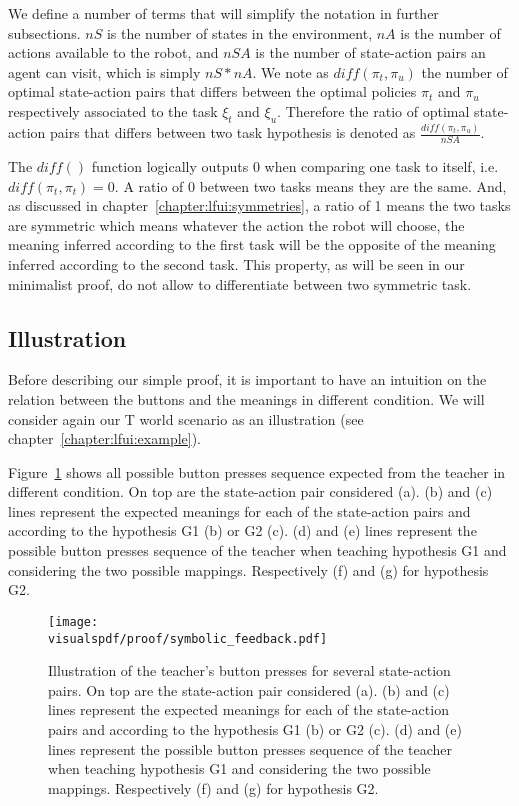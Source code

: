 We define a number of terms that will simplify the notation in further subsections. $nS$ is the number of states in the environment, $nA$ is the number of actions available to the robot, and $nSA$ is the number of state-action pairs an agent can visit, which is simply $nS * nA$. We note as $diff(\pi_t, \pi_u)$ the number of optimal state-action pairs that differs between the optimal policies $\pi_t$ and $\pi_u$ respectively associated to the task $\xi_t$ and $\xi_u$. Therefore the ratio of optimal state-action pairs that differs between two task hypothesis is denoted as $\frac{diff(\pi_t, \pi_u)}{nSA}$. 

The $diff()$ function logically outputs $0$ when comparing one task to itself, i.e. $diff(\pi_t, \pi_t) = 0$. A ratio of 0 between two tasks means they are the same. And, as discussed in chapter~\ref{chapter:lfui:symmetries}, a ratio of 1 means the two tasks are symmetric which means whatever the action the robot will choose, the meaning inferred according to the first task will be the opposite of the meaning inferred according to the second task. This property, as will be seen in our minimalist proof, do not allow to differentiate between two symmetric task.


\subsection{Illustration}

Before describing our simple proof, it is important to have an intuition on the relation between the buttons and the meanings in different condition. We will consider again our T world scenario as an illustration (see chapter~\ref{chapter:lfui:example}).


Figure~\ref{fig:proofsymbolic} shows all possible button presses sequence expected from the teacher in different condition. On top are the state-action pair considered (a). (b) and (c) lines represent the expected meanings for each of the state-action pairs and according to the hypothesis G1 (b) or G2 (c). (d) and (e) lines represent the possible button presses sequence of the teacher when teaching hypothesis G1 and considering the two possible mappings. Respectively (f) and (g) for hypothesis G2.

\begin{figure}[!htbp]
\centering
\texttt{[image: \\visualspdf/proof/symbolic\_feedback.pdf]}
\caption{Illustration of the teacher's button presses for several state-action pairs. On top are the state-action pair considered (a). (b) and (c) lines represent the expected meanings for each of the state-action pairs and according to the hypothesis G1 (b) or G2 (c). (d) and (e) lines represent the possible button presses sequence of the teacher when teaching hypothesis G1 and considering the two possible mappings. Respectively (f) and (g) for hypothesis G2.}
\label{fig:proofsymbolic}
\end{figure} 

